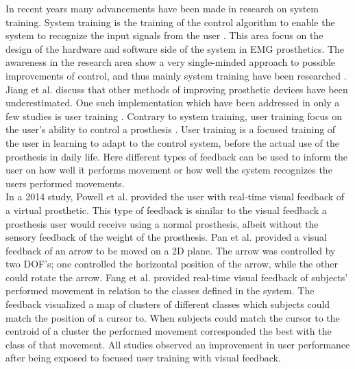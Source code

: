 In recent years many advancements have been made in research on system training. System training is the training of the control algorithm to enable the system to recognize the input signals from the user \cite{Fougner2012}. This area focus on the design of the hardware and software side of the system in EMG prosthetics. %
The awareness in the research area show a very single-minded approach to possible improvements of control, and thus mainly system training have been researched \cite{Jiang2012}. Jiang et al. \cite{Jiang2012} discuss that other methods of improving prosthetic devices have been underestimated. One such implementation which have been addressed in only a few studies is user training \cite{Powell2014, Fang2017, Pan2017}. Contrary to system training, user training focus on the user's ability to control a prosthesis \cite{Fougner2012}. User training is a focused training of the user in learning to adapt to the control system, before the actual use of the prosthesis in daily life. Here different types of feedback can be used to inform the user on how well it performs movement or how well the system recognizes the users performed movements. \cite{Powell2014, Simon2013} \\
In a 2014 study, Powell et al. \cite{Powell2014} provided the user with real-time visual feedback of a virtual prosthetic. This type of feedback is similar to the visual feedback a prosthesis user would receive using a normal prosthesis, albeit without the sensory feedback of the weight of the prosthesis. Pan et al. \cite{Pan2017} provided a visual feedback of an arrow to be moved on a 2D plane. The arrow was controlled by two DOF's; one controlled the horizontal position of the arrow, while the other could rotate the arrow. Fang et al. \cite{Fang2017} provided real-time visual feedback of subjects' performed movement in relation to the classes defined in the system. The feedback visualized a map of clusters of different classes which subjects could match the position of a cursor to. When subjects could match the cursor to the centroid of a cluster the performed movement corresponded the best with the class of that movement. \cite{Fang2017} All studies observed an improvement in user performance after being exposed to focused user training with visual feedback. 

